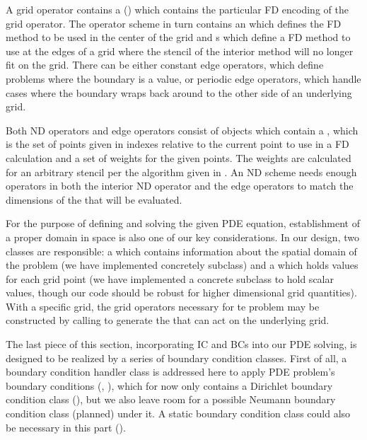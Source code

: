 \documentclass{article}
\begin{document}
	A grid operator contains a  () which contains the particular FD encoding of the grid operator. The operator scheme in turn contains an  which defines the FD method to be used in the center of the grid and s which define a FD method to use at the edges of a grid where the stencil of the interior method will no longer fit on the grid. There can be either constant edge operators, which define problems where the boundary is a value, or periodic edge operators, which handle cases where the boundary wraps back around to the other side of an underlying grid. 

	Both ND operators and edge operators consist of  objects which contain a , which is the set of points given in indexes relative to the current point to use in a FD calculation and a set of weights for the given points. The weights are calculated for an arbitrary stencil per the algorithm given in \cite{WikipediaFiniteDiffCoeffs}. An ND scheme needs enough operators in both the interior ND operator and the edge operators to match the dimensions of the  that will be evaluated.

	For the purpose of defining and solving the given PDE equation, establishment of a proper domain in space is also one of our key considerations. In our design, two classes are responsible: a  which contains information about the spatial domain of the problem (we have implemented concretely  subclass) and a  which holds values for each grid point (we have implemented a concrete  subclass to hold scalar values, though our code should be robust for higher dimensional grid quantities). With a specific grid, the grid operators necessary for te problem may be constructed by calling  to generate the  that can act on the underlying grid. 

	The last piece of this section, incorporating IC and BCs into our PDE solving, is designed to be realized by a series of boundary condition classes. First of all, a boundary condition handler class is addressed here to apply PDE problem’s boundary conditions (, ), which for now only contains a Dirichlet boundary condition class (), but we also leave room for a possible Neumann boundary condition class (planned) under it. A static boundary condition class could also be necessary in this part (). 
\end{document}
